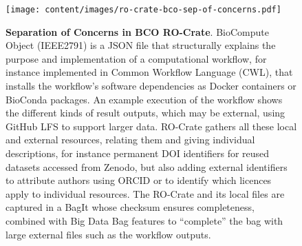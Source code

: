 \begin{figure}[t]
    \centering
    \texttt{[image: content/images/ro-crate-bco-sep-of-concerns.pdf]}
    \caption{\textbf{Separation of Concerns in BCO RO-Crate}. BioCompute Object (IEEE2791) is a JSON file that structurally explains the purpose and implementation of a computational workflow, for instance implemented in Common Workflow Language (CWL), that installs the workflow’s software dependencies as Docker containers or BioConda packages. An example execution of the workflow shows the different kinds of result outputs, which may be external, using GitHub LFS to support larger data. RO-Crate gathers all these local and external resources, relating them and giving individual descriptions, for instance permanent DOI identifiers for reused datasets accessed from Zenodo, but also adding external identifiers to attribute authors using ORCID or to identify which licences apply to individual resources. The RO-Crate and its local files are captured in a BagIt whose checksum ensures completeness, combined with Big Data Bag \cite{doi:10.1109/BigData.2016.7840618} features to “complete” the bag with large external files such as the workflow outputs.}
    \label{fig:sep_concerns}
\end{figure}